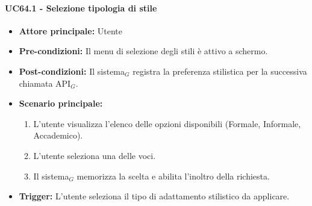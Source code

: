 \documentclass[a4paper, 10pt]{article}
\begin{document}
\paragraph{UC64.1 - Selezione tipologia di stile}
\hypertarget{uc:64.1}{}
\begin{itemize}
    \item \textbf{Attore principale:} Utente
    \item \textbf{Pre-condizioni:} Il menu di selezione degli stili è attivo a schermo.
    \item \textbf{Post-condizioni:} Il sistema$_G$ registra la preferenza stilistica per la successiva chiamata API$_G$.
    \item \textbf{Scenario principale:}
        \begin{enumerate}
            \item L'utente visualizza l'elenco delle opzioni disponibili (Formale, Informale, Accademico).
            \item L'utente seleziona una delle voci.
            \item Il sistema$_G$ memorizza la scelta e abilita l'inoltro della richiesta.
        \end{enumerate}
    \item \textbf{Trigger:} L'utente seleziona il tipo di adattamento stilistico da applicare.
\end{itemize}


\hypertarget{uc:65}{}
\end{document}
